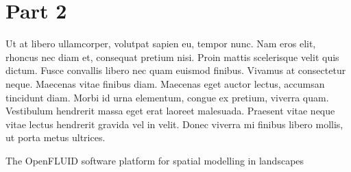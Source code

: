 \section{Part 2}

Ut at libero ullamcorper, volutpat sapien eu, tempor nunc. Nam eros elit, rhoncus nec diam et, consequat pretium nisi. 
Proin mattis scelerisque velit quis dictum. Fusce convallis libero nec quam euismod finibus. Vivamus at consectetur neque. 
Maecenas vitae finibus diam. Maecenas eget auctor lectus, accumsan tincidunt diam. Morbi id urna elementum, congue ex pretium, viverra quam. 
Vestibulum hendrerit massa eget erat laoreet malesuada. 
Praesent vitae neque vitae lectus hendrerit gravida vel in velit. Donec viverra mi finibus libero mollis, ut porta metus ultrices. 


The OpenFLUID software platform for spatial modelling in landscapes \cite{Fabre2013}

